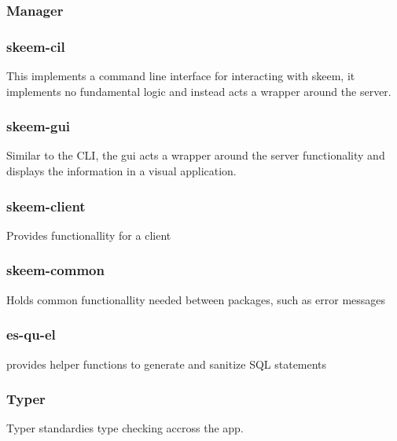 \documentclass[
  12pt,
]{article}
\begin{document}
\hypertarget{manager}{%
\subsubsection{Manager}\label{manager}}

\hypertarget{skeem-cil}{%
\subsubsection{skeem-cil}\label{skeem-cil}}

This implements a command line interface for interacting with skeem, it
implements no fundamental logic and instead acts a wrapper around the
server.

\hypertarget{skeem-gui}{%
\subsubsection{skeem-gui}\label{skeem-gui}}

Similar to the CLI, the gui acts a wrapper around the server
functionality and displays the information in a visual application.

\hypertarget{skeem-client}{%
\subsubsection{skeem-client}\label{skeem-client}}

Provides functionallity for a client

\hypertarget{skeem-common}{%
\subsubsection{skeem-common}\label{skeem-common}}

Holds common functionallity needed between packages, such as error
messages

\hypertarget{es-qu-el}{%
\subsubsection{es-qu-el}\label{es-qu-el}}

provides helper functions to generate and sanitize SQL statements

\hypertarget{typer}{%
\subsubsection{Typer}\label{typer}}

Typer standardies type checking accross the app.
\end{document}
